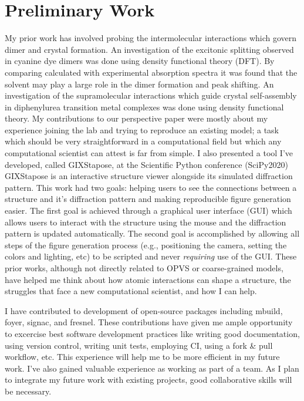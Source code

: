 \section*{Preliminary Work}

My prior work has involved probing the intermolecular interactions which govern dimer and crystal formation.
An investigation of the excitonic splitting observed in cyanine dye dimers was done using density functional theory (DFT)\cite{Fothergill2018}.
By comparing calculated with experimental absorption spectra it was found that the solvent may play a large role in the dimer formation and peak shifting.
An investigation of the supramolecular interactions which guide crystal self-assembly in diphenylurea transition metal complexes was done using density functional theory\cite{Millard2019a}. 
My contributions to our perspective paper were mostly about my experience joining the lab and trying to reproduce an existing model; a task which should be very straightforward in a computational field but which any computational scientist can attest is far from simple\cite{Jankowski2019}. 
I also presented a tool I've developed, called GIXStapose, at the Scientific Python conference (SciPy2020)\cite{gixstapose, scipy2020}
GIXStapose is an interactive structure viewer alongside its simulated diffraction pattern.
This work had two goals: helping users to see the connections between a structure and it's diffraction pattern and making reproducible figure generation easier.
The first goal is achieved through a graphical user interface (GUI) which allows users to interact with the structure using the mouse and the diffraction pattern is updated automatically.
The second goal is accomplished by allowing all steps of the figure generation process (e.g., positioning the camera, setting the colors and lighting, etc) to be scripted and never \textit{requiring} use of the GUI\@.
These prior works, although not directly related to OPVS or coarse-grained models, have helped me think about how atomic interactions can shape a structure, the struggles that face a new computational scientist, and how I can help.

I have contributed to development of open-source packages including mbuild, foyer, signac, and fresnel\cite{mbuild, foyer, signac, fresnel}.
These contributions have given me ample opportunity to excercise best software development practices like writing good documentation, using version control, writing unit tests, employing CI, using a fork \& pull workflow, etc.
This experience will help me to be more efficient in my future work.
I've also gained valuable experience as working as part of a team.
As I plan to integrate my future work with existing projects, good collaborative skills will be necessary.

